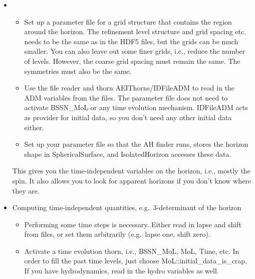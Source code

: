 \begin{itemize}

\item

\begin{itemize}

Computing time-independent quantities.\\

The 3-metric and the extrinsic curvature must be available in HDF5
files.

\item Set up a parameter file for a grid structure that contains the
  region around the horizon.  The refinement level structure and grid
  spacing etc. needs to be the same as in the HDF5 files, but the
  grids can be much smaller.  You can also leave out some finer grids,
  i.e., reduce the number of levels.  However, the coarse grid spacing
  must remain the same.  The symmetries must also be the same.

\item Use the file reader and thorn AEIThorns/IDFileADM to read in the
  ADM variables from the files.  The parameter file does not need to
  activate BSSN\_MoL or any time evolution mechanism.  IDFileADM acts
  as provider for initial data, so you don't need any other initial
  data either.

\item Set up your parameter file so that the AH finder runs, stores
  the horizon shape in SphericalSurface,
  and IsolatedHorizon accesses these data.\\

\end{itemize}

This gives you the time-independent variables on the horizon, i.e.,
mostly the spin.  It also allows you to look for apparent horizons if
you don't know where they are.


\item
  Computing time-independent quantities, e.g.\ 3-determinant of the horizon\\

\begin{itemize}

\item Performing some time steps is necessary. Either read in lapse
  and shift from files, or set them arbitrarily (e.g.\ lapse one,
  shift zero).

\item Activate a time evolution thorn, i.e., BSSN\_MoL, MoL, Time,
  etc.  In order to fill the past time levels, just choose
  MoL::initial\_data\_is\_crap.  If you have hydrodynamics, read in
  the hydro variables as well.


\end{itemize}
\end{itemize}
